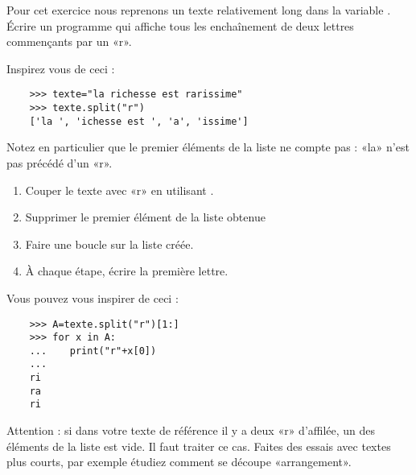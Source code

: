 
\begin{exercice}\label{exoPremiere-0054}

    Pour cet exercice nous reprenons un texte relativement long dans la variable . Écrire un programme qui affiche tous les enchaînement de deux lettres commençants par un «r».

    Inspirez vous de ceci :
    \begin{verbatim}
    >>> texte="la richesse est rarissime"
    >>> texte.split("r")
    ['la ', 'ichesse est ', 'a', 'issime']
    \end{verbatim}

    Notez en particulier que le premier éléments de la liste ne compte pas : «la» n'est pas précédé d'un «r».
    \begin{enumerate}
        \item
            Couper le texte avec «r» en utilisant .
        \item
            Supprimer le premier élément de la liste obtenue
        \item
            Faire une boucle  sur la liste créée.
        \item
            À chaque étape, écrire la première lettre.
    \end{enumerate}

    Vous pouvez vous inspirer de ceci :
    \begin{verbatim}
    >>> A=texte.split("r")[1:]
    >>> for x in A:
    ...    print("r"+x[0])
    ... 
    ri
    ra
    ri
    \end{verbatim}

    Attention : si dans votre texte de référence il y a deux «r» d'affilée, un des éléments de la liste est vide. Il faut traiter ce cas. Faites des essais avec textes plus courts, par exemple étudiez comment se découpe «arrangement».

\end{exercice}
